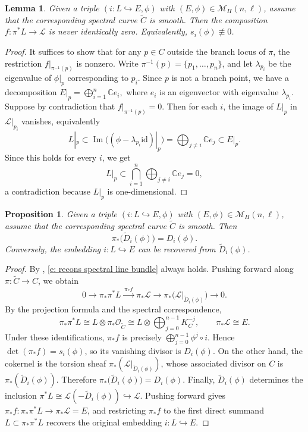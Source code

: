 \documentclass[twoside, 11pt]{article}
\numberwithin{equation}{section}
\theoremstyle{theorem}
\numberwithin{theorem}{section}
\newtheorem{lemma}[lemma]{Lemma}
\newtheorem{proposition}[proposition]{Proposition}
\theoremstyle{definition}
\begin{document}
\begin{lemma}\label{l:section not zero}
Given a triple \((i:L\hookrightarrow E,\phi)\) with \((E,\phi)\in \mathcal M_H(n,\ell)\), assume that the corresponding spectral curve \(\widetilde C\) is smooth. Then the composition \(f:\pi^*L\to \mathcal L\) is never identically zero. Equivalently, \(s_i(\phi)\not\equiv 0\).
\end{lemma}

\begin{proof}
It suffices to show that for any \(p\in C\) outside the branch locus of \(\pi\), the restriction \(f|_{\pi^{-1}(p)}\) is nonzero. Write \(\pi^{-1}(p)=\{p_1,\dots,p_n\}\), and let \(\lambda_{p_i}\) be the eigenvalue of \(\phi|_p\) corresponding to \(p_i\). Since \(p\) is not a branch point, we have a decomposition
\(
E|_p=\bigoplus_{i=1}^n \mathbb C e_i,
\)
where \(e_i\) is an eigenvector with eigenvalue \(\lambda_{p_i}\). Suppose by contradiction that \(f|_{\pi^{-1}(p)}=0\). Then for each \(i\), the image of \(L|_p\) in \(\mathcal L|_{p_i}\) vanishes, equivalently
\[
L|_p\subset \operatorname{Im}\bigl((\phi-\lambda_{p_i}\mathrm{id})|_p\bigr)=\bigoplus_{j\ne i}\mathbb C e_j \subset E|_p.
\]
Since this holds for every \(i\), we get
\[
L|_p\subset \bigcap_{i=1}^n \bigoplus_{j\ne i}\mathbb C e_j=0,
\]
a contradiction because \(L|_p\) is one-dimensional.
\end{proof}

\begin{proposition}\label{prop-Nm(D)}
Given a triple \((i:L\hookrightarrow E,\phi)\) with \((E,\phi)\in \mathcal M_H(n,\ell)\), assume that the corresponding spectral curve \(\widetilde C\) is smooth. Then
\[
\pi_\ast \bigl(\widetilde D_i(\phi)\bigr)=D_i(\phi).
\]
Conversely, the embedding \(i:L\hookrightarrow E\) can be recovered from \(\widetilde D_i(\phi)\).
\end{proposition}

\begin{proof}
By , \eqref{e: recons spectral line bundle} always holds. Pushing forward along \(\pi:\widetilde C\to C\), we obtain
\[
0\to \pi_*\pi^*L\xrightarrow{\,\pi_*f\,}\pi_*\mathcal L\to \pi_*\bigl(\mathcal L|_{\widetilde D_i(\phi)}\bigr)\to 0.
\]
By the projection formula and the spectral correspondence,
\[
\pi_*\pi^*L\cong L\otimes \pi_*\mathcal O_{\widetilde C}\cong L\otimes \bigoplus_{j=0}^{n-1}K_C^{-j},
\qquad
\pi_*\mathcal L\cong E.
\]
Under these identifications, \(\pi_*f\) is precisely \(\bigoplus_{j=0}^{n-1}\phi^j\circ i\). Hence \(\det(\pi_*f)=s_i(\phi)\), so its vanishing divisor is \(D_i(\phi)\). On the other hand, the cokernel is the torsion sheaf \(\pi_*(\mathcal L|_{\widetilde D_i(\phi)})\), whose associated divisor on \(C\) is \(\pi_\ast(\widetilde D_i(\phi))\). Therefore
\(
\pi_\ast \bigl(\widetilde D_i(\phi)\bigr) = D_i(\phi).
\)
Finally, \(\widetilde D_i(\phi)\) determines the inclusion
\(
\pi^*L\cong \mathcal L(-\widetilde D_i(\phi))\hookrightarrow \mathcal L.
\)
Pushing forward gives \(\pi_*f:\pi_*\pi^*L\to \pi_*\mathcal L=E\), and restricting \(\pi_*f\) to the first direct summand \(L\subset \pi_*\pi^*L\) recovers the original embedding \(i:L\hookrightarrow E\).
\end{proof}
\end{document}
